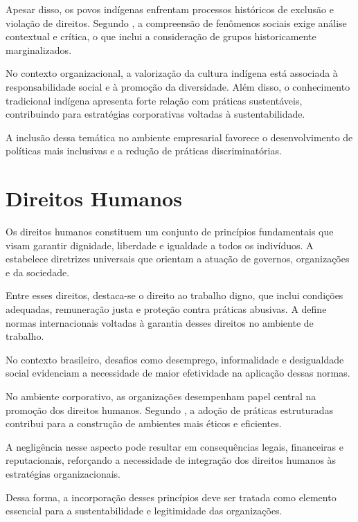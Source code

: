 \documentclass[
    12pt
    ,oneside
    ,a4paper
    ,chapter=TITLE
    ,section=TITLE
    ,sumario=abnt-6027-2012]{abntex2}
\begin{document}
Apesar disso, os povos indígenas enfrentam processos históricos de exclusão e violação de direitos. Segundo , a compreensão de fenômenos sociais exige análise contextual e crítica, o que inclui a consideração de grupos historicamente marginalizados.

No contexto organizacional, a valorização da cultura indígena está associada à responsabilidade social e à promoção da diversidade. Além disso, o conhecimento tradicional indígena apresenta forte relação com práticas sustentáveis, contribuindo para estratégias corporativas voltadas à sustentabilidade.

A inclusão dessa temática no ambiente empresarial favorece o desenvolvimento de políticas mais inclusivas e a redução de práticas discriminatórias.
\chapter{Direitos Humanos}

Os direitos humanos constituem um conjunto de princípios fundamentais que visam garantir dignidade, liberdade e igualdade a todos os indivíduos. A  estabelece diretrizes universais que orientam a atuação de governos, organizações e da sociedade.

Entre esses direitos, destaca-se o direito ao trabalho digno, que inclui condições adequadas, remuneração justa e proteção contra práticas abusivas. A  define normas internacionais voltadas à garantia desses direitos no ambiente de trabalho.

No contexto brasileiro, desafios como desemprego, informalidade e desigualdade social evidenciam a necessidade de maior efetividade na aplicação dessas normas.

No ambiente corporativo, as organizações desempenham papel central na promoção dos direitos humanos. Segundo , a adoção de práticas estruturadas contribui para a construção de ambientes mais éticos e eficientes.

A negligência nesse aspecto pode resultar em consequências legais, financeiras e reputacionais, reforçando a necessidade de integração dos direitos humanos às estratégias organizacionais.

Dessa forma, a incorporação desses princípios deve ser tratada como elemento essencial para a sustentabilidade e legitimidade das organizações.
\end{document}
